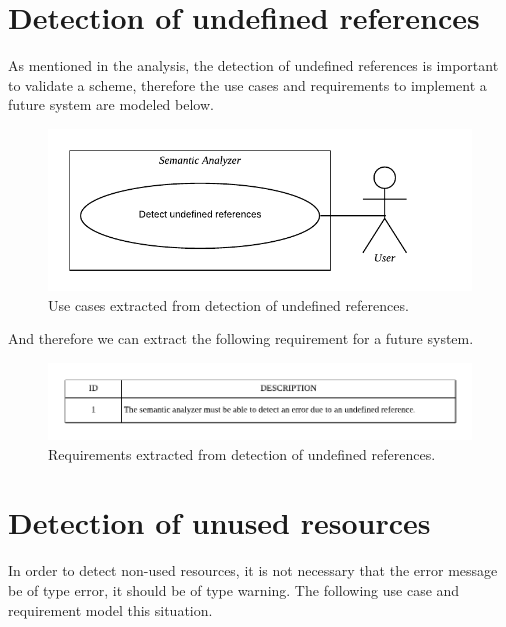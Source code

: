 \section{Detection of undefined references}
As mentioned in the analysis, the detection of undefined references is
important to validate a scheme, therefore the use cases and requirements
to implement a future system are modeled below.

\begin{figure}[h!]
    \includegraphics[scale=0.8]{images/und-ref-use-case.pdf}
    \centering
    \caption[Use cases extracted from detection of undefined references]{Use cases extracted from detection of undefined references.}
    \label{fig:und-ref-use-case}
\end{figure}

And therefore we can extract the following requirement for a future system.

\begin{figure}[h!]
    \includegraphics[scale=0.8]{images/und-ref-req.pdf}
    \centering
    \caption[Requirements extracted from detection of undefined references]{Requirements extracted from detection of undefined references.}
    \label{fig:und-ref-req}
\end{figure}

\section{Detection of unused resources}
In order to detect non-used resources, it is not necessary that
the error message be of type error, it should be of type warning.
The following use case and requirement model this situation.

